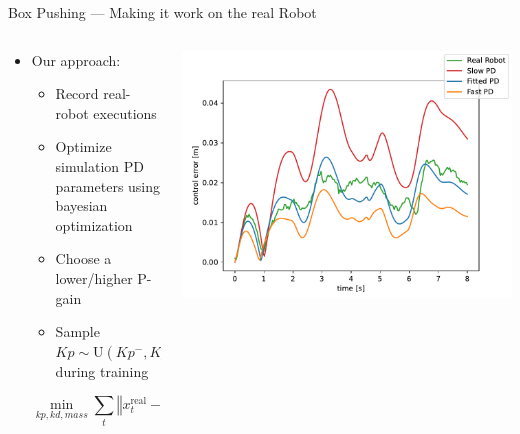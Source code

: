 \documentclass[16:9,en,navbarinfooter]{sdqbeamer}
\begin{document}
\begin{frame}{Box Pushing --- Making it work on the real Robot}
	\begin{columns}
		\begin{column}{0.5\textwidth}
			\begin{itemize}
				\item Our approach:
				      \begin{itemize}
					      \item Record real-robot executions
					      \item Optimize simulation PD parameters using bayesian optimization
					      \item Choose a lower/higher P-gain
					      \item Sample $Kp \sim \text{U}(Kp^-, Kp^+)$ during training
				      \end{itemize}

				      \[
					      \min_{kp, kd, mass} \sum_t \left\Vert x_t^\text{real} - x_t^\text{sim}(kp, kd, mass) \right\Vert
				      \]
			\end{itemize}
		\end{column}

		\begin{column}{0.5\textwidth}
			\includegraphics[width=\linewidth]{media/ctrl_error.pdf}\\
		\end{column}
	\end{columns}

\end{frame}
\end{document}
